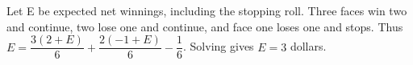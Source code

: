 Let E be expected net winnings, including the stopping roll. Three faces win two and continue, two lose one and continue, and face one loses one and stops. Thus $E=\dfrac{3(2+E)}{6}+\dfrac{2(-1+E)}{6}-\dfrac{1}{6}$. Solving gives $E=\boxed3$ dollars.
